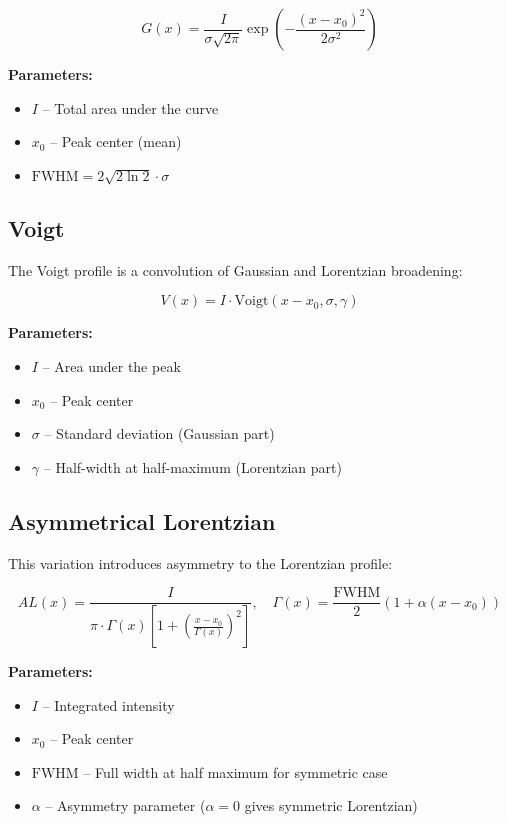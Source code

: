 \begin{equation}
G(x) = \frac{I}{\sigma \sqrt{2\pi}} \exp\left(-\frac{(x - x_0)^2}{2\sigma^2}\right)
\end{equation}

\textbf{Parameters:}
\begin{itemize}
\item $I$ – Total area under the curve
\item $x_0$ – Peak center (mean)
\item $\mathrm{FWHM} = 2\sqrt{2 \ln 2} \cdot \sigma$
\end{itemize}

\subsection{Voigt}
The Voigt profile is a convolution of Gaussian and Lorentzian broadening:

\begin{equation}
V(x) = I \cdot \mathrm{Voigt}(x - x_0, \sigma, \gamma)
\end{equation}

\textbf{Parameters:}
\begin{itemize}
\item $I$ – Area under the peak
\item $x_0$ – Peak center
\item $\sigma$ – Standard deviation (Gaussian part)
\item $\gamma$ – Half-width at half-maximum (Lorentzian part)
\end{itemize}

\subsection{Asymmetrical Lorentzian}
This variation introduces asymmetry to the Lorentzian profile:

\begin{equation}
AL(x) = \frac{I}{\pi \cdot \Gamma(x) \left[1 + \left(\frac{x - x_0}{\Gamma(x)}\right)^2 \right]}, \quad \Gamma(x) = \frac{\mathrm{FWHM}}{2} (1 + \alpha(x - x_0))
\end{equation}

\textbf{Parameters:}
\begin{itemize}
\item $I$ – Integrated intensity
\item $x_0$ – Peak center
\item $\mathrm{FWHM}$ – Full width at half maximum for symmetric case
\item $\alpha$ – Asymmetry parameter ($\alpha = 0$ gives symmetric Lorentzian)
\end{itemize}


